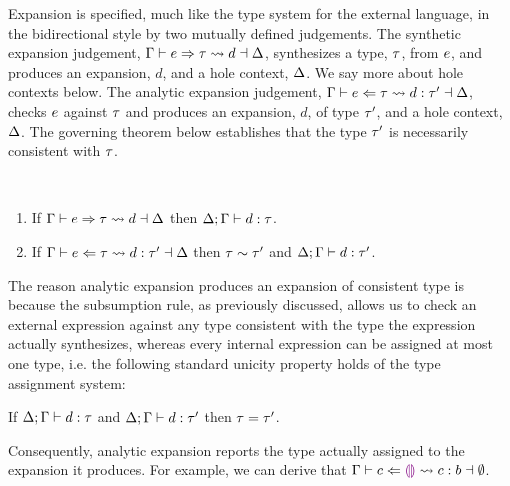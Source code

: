 Expansion is specified, much like the type system for the external language, in the bidirectional style by two mutually defined judgements. The synthetic expansion judgement, $\Gamma \vdash e \Rightarrow \tau \leadsto d \dashv \Delta$, synthesizes a type, $\tau$, from $e$, and produces an expansion, $d$, and a hole context, $\Delta$. We say more about hole contexts below. The analytic expansion judgement, $\Gamma \vdash e \Leftarrow \tau \leadsto d : \tau' \dashv \Delta$, checks $e$ against $\tau$ and produces an expansion, $d$, of type $\tau'$, and a hole context, $\Delta$. The governing theorem below establishes that the type $\tau'$ is necessarily consistent with $\tau$.
%
%
\begin{thm}\label{thm:typed-expansion} ~
  \begin{enumerate}[nolistsep]
    \item
      If $\Gamma \vdash e \Rightarrow \tau \leadsto d \dashv \Delta$
      then $\Delta; \Gamma \vdash d : \tau$.
    \item
      If $\Gamma \vdash e \Leftarrow \tau \leadsto d : \tau' \dashv \Delta$
      then $\tau \sim \tau'$ and $\Delta; \Gamma \vdash d : \tau'$.
  \end{enumerate}
\end{thm}
\noindent
The reason analytic expansion produces an expansion of consistent type is because the subsumption rule, as previously discussed, allows us to check an external expression against any type consistent with the type the expression actually synthesizes, whereas every internal expression can be assigned at most one type, i.e. the following standard unicity property holds of the type assignment system: 
\begin{thm}
  If $\Delta; \Gamma \vdash d : \tau$
  and $\Delta; \Gamma \vdash d : \tau'$
  then $\tau=\tau'$.
\end{thm}
\noindent
Consequently, analytic expansion reports the type actually assigned to the expansion it produces. For example, we can derive that $\Gamma \vdash c \Leftarrow \textcolor{violet}{\llparenthesis}\textcolor{violet}{\rrparenthesis} \leadsto c : b \dashv \emptyset$.%

